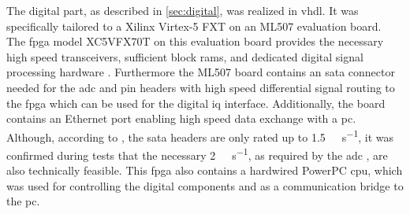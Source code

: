 \documentclass[12pt,a4paper,parskip=full,abstract=true,BCOR=12mm]{scrreprt}
\begin{document}
The digital part, as described in \cref{sec:digital}, was realized in \gls{vhdl}.
It was specifically tailored to a Xilinx \mbox{Virtex-5} FXT on an ML507 evaluation board.
The \gls{fpga} model XC5VFX70T on this evaluation board provides the necessary
high speed transceivers, sufficient block \glspl{ram}, and dedicated digital
signal processing hardware \cite{virtex5ds}. Furthermore the ML507 board contains
an \gls{sata} connector needed for the \gls{adc} and pin headers with high speed differential signal routing to the \gls{fpga}
which can be used for the digital \gls{iq} interface. Additionally, the board contains an
Ethernet port enabling high speed data exchange with a \gls{pc}. Although, according to
\cite{ml507}, the \gls{sata} headers are only rated up to \SI{1.5}{\giga\bit\per\second},
it was confirmed during tests that the necessary \SI{2}{\giga\bit\per\second}, as required
by the \gls{adc} \cite{ltc2274}, are also technically feasible. This \gls{fpga} also contains a
hardwired PowerPC \gls{cpu}, which was used for controlling the digital components
and as a communication bridge to the \gls{pc}.

\end{document}
